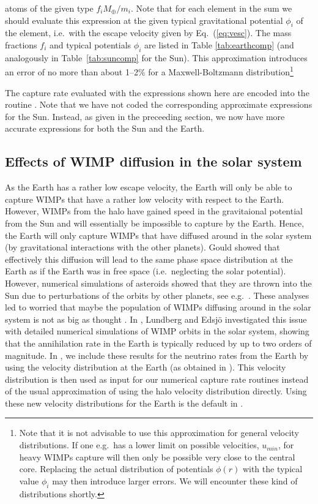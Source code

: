 atoms of the given type $f_i M_\oplus/m_i$. Note that for each element
in the sum we should evaluate this expression at the given typical
gravitational potential $\phi_i$ of the element, i.e.\ with the escape
velocity given by Eq.~(\ref{eq:vesc}). The mass fractions $f_i$ and
typical potentials $\phi_i$ are listed in Table
\ref{tab:earthcomp} (and analogously in Table~\ref{tab:suncomp} for
the Sun). This approximation introduces an error of no more
than about 1--2\% for a Maxwell-Boltzmann distribution\footnote{Note
  that it is not advisable to use this approximation for general
  velocity distributions. If one e.g.\ has a lower limit on possible
  velocities, $u_{min}$, for heavy WIMPs capture will then only be
  possible very close to the central core. Replacing the actual
  distribution of potentials $\phi(r)$ with the typical value $\phi_i$
  may then introduce larger errors. We will encounter these kind of
  distributions shortly.} 

The capture rate evaluated with the expressions shown here are encoded
into the routine . Note that we have not coded the
corresponding approximate expressions for the Sun. Instead, as given
in the preceeding section, we now have more accurate expressions for
both the Sun and the Earth.

\subsection{Effects of WIMP diffusion in the solar system}

As the Earth has a rather low escape velocity, the Earth will only be
able to capture WIMPs that have a rather low velocity with respect to
the Earth. However, WIMPs from the halo have gained speed in the
gravitaional potential from the Sun and will essentially be impossible
to capture by the Earth. Hence, the Earth will only capture WIMPs that
have diffused around in the solar system (by gravitational
interactions with the other planets). Gould showed \cite{Gould:1991aa}
that effectively this diffusion will lead to the same phase space
distribution at the Earth as if the Earth was in free space
(i.e.\ neglecting the solar potential). However, numerical simulations
of asteroids showed that they are thrown into the Sun due to
perturbations of the orbits by other planets, see
e.g.\ \cite{Farinella:1994aa}. These analyses led to worried that maybe the
population of WIMPs diffusing around in the solar system is not as big
as thought \cite{Gould:1999je}. In \cite{Lundberg:2004dn}, Lundberg and
Edsj\"o investigated this issue with detailed numerical simulations of
WIMP orbits in the solar system, showing that the annihilation rate in
the Earth is typically reduced by up to two orders of magnitude. In
\ds, we include these results for the neutrino rates from the Earth by
using the velocity distribution at the Earth (as obtained in
\cite{Lundberg:2004dn}). This velocity distribution is then used as input
for our numerical capture rate routines instead of the usual
approximation of using the halo velocity distribution directly. Using
these new velocity distributions for the Earth is the default in \ds.

